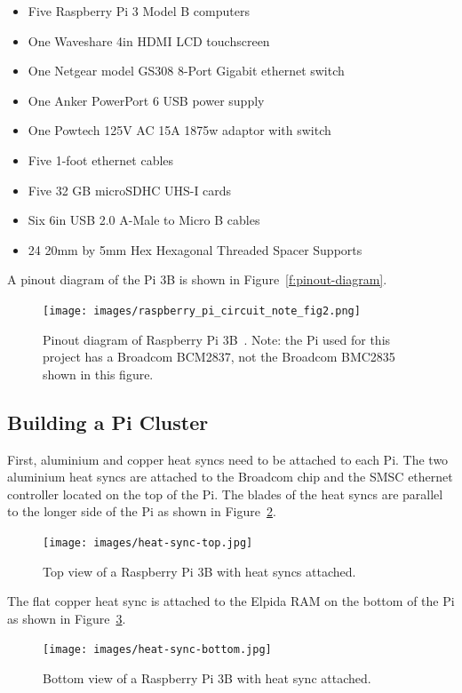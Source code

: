 \begin{itemize}
\item Five Raspberry Pi 3 Model B computers 
\item One Waveshare 4in HDMI LCD touchscreen
\item One Netgear model GS308 8-Port Gigabit ethernet switch
\item One Anker PowerPort 6 USB power supply
\item One Powtech 125V AC 15A 1875w adaptor with switch
\item Five 1-foot ethernet cables
\item Five 32 GB microSDHC UHS-I cards
\item Six 6in USB 2.0 A-Male to Micro B cables
\item 24 20mm by 5mm Hex Hexagonal Threaded Spacer Supports
\end{itemize}

A pinout diagram of the Pi 3B is shown in Figure~\ref{f:pinout-diagram}.

\begin{figure}[!ht]
  \centering\texttt{[image: images/raspberry\_pi\_circuit\_note\_fig2.png]} \caption{Pinout
  diagram of Raspberry Pi 3B~\cite{hid-sp18-419-pi-pinout}. Note: the
  Pi used for this project has a Broadcom BCM2837, not the Broadcom
  BMC2835 shown in this figure.}\label{f:pinout-digram}
\end{figure}

\subsection{Building a Pi Cluster}
First, aluminium and copper heat syncs need to be attached to each
Pi. The two aluminium heat syncs are attached to the Broadcom chip and
the SMSC ethernet controller located on the top of the Pi. The blades
of the heat syncs are parallel to the longer side of the Pi as shown
in Figure~\ref{f:heat-sync-top}.

\begin{figure}[!ht]
  \centering\texttt{[image: images/heat-sync-top.jpg]} \caption{Top
  view of a Raspberry Pi 3B with heat syncs
  attached.}\label{f:heat-sync-top}
\end{figure}

The flat copper heat sync is attached to the Elpida RAM on the bottom
of the Pi as shown in Figure~\ref{f:heat-sync-bottom}.

\begin{figure}[!ht]
  \centering\texttt{[image: images/heat-sync-bottom.jpg]} \caption{Bottom
  view of a Raspberry Pi 3B with heat sync
  attached.}\label{f:heat-sync-bottom}
\end{figure}

